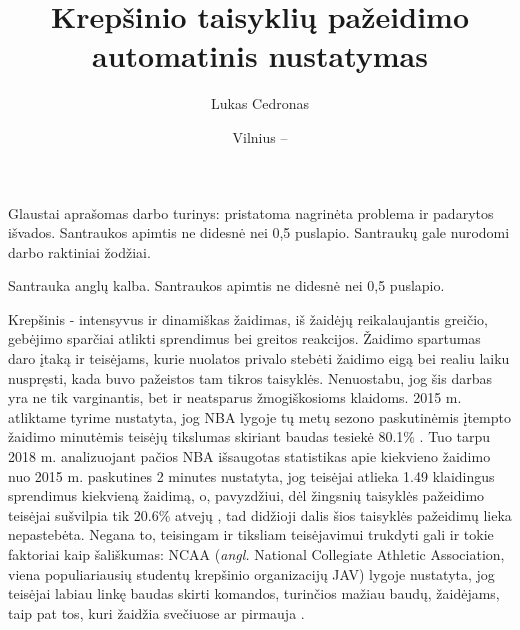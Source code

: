 \documentclass{VUMIFPSbakalaurinis}
\institute{Informatikos institutas}  %
\title{Krepšinio taisyklių pažeidimo automatinis nustatymas	}
\author{Lukas Cedronas}
\date{Vilnius – \the\year}
\begin{document}
\maketitle


Glaustai aprašomas darbo turinys: pristatoma nagrinėta problema ir padarytos
išvados. Santraukos apimtis ne didesnė nei 0,5 puslapio. Santraukų gale
nurodomi darbo raktiniai žodžiai. 

Santrauka anglų kalba. Santraukos apimtis ne didesnė nei 0,5 puslapio.

\tableofcontents



Krepšinis - intensyvus ir dinamiškas žaidimas, iš žaidėjų reikalaujantis greičio, gebėjimo sparčiai atlikti sprendimus bei greitos reakcijos. Žaidimo spartumas daro įtaką ir teisėjams, kurie nuolatos privalo stebėti žaidimo eigą bei realiu laiku nuspręsti, kada buvo pažeistos tam tikros taisyklės. Nenuostabu, jog šis darbas yra ne tik varginantis, bet ir neatsparus žmogiškosioms klaidoms. 2015 m. atliktame tyrime nustatyta, jog NBA lygoje tų metų sezono paskutinėmis įtempto žaidimo minutėmis teisėjų tikslumas skiriant baudas tesiekė 80.1\% \cite{NBA_bias_Referee}. Tuo tarpu 2018 m. analizuojant pačios NBA išsaugotas statistikas apie kiekvieno žaidimo nuo 2015 m. paskutines 2 minutes nustatyta, jog teisėjai atlieka 1.49 klaidingus sprendimus kiekvieną žaidimą, o, pavyzdžiui, dėl žingsnių taisyklės pažeidimo teisėjai sušvilpia tik 20.6\% atvejų \cite{SiglerK}, tad didžioji dalis šios taisyklės pažeidimų lieka nepastebėta. Negana to, teisingam ir tiksliam teisėjavimui trukdyti gali ir tokie faktoriai kaip šališkumas: NCAA (\textit{angl.} National Collegiate Athletic Association, viena populiariausių studentų krepšinio organizacijų JAV) lygoje nustatyta, jog teisėjai labiau linkę baudas skirti komandos, turinčios mažiau baudų, žaidėjams, taip pat tos, kuri žaidžia svečiuose ar pirmauja \cite{OfficiatingBias}. 
\end{document}
